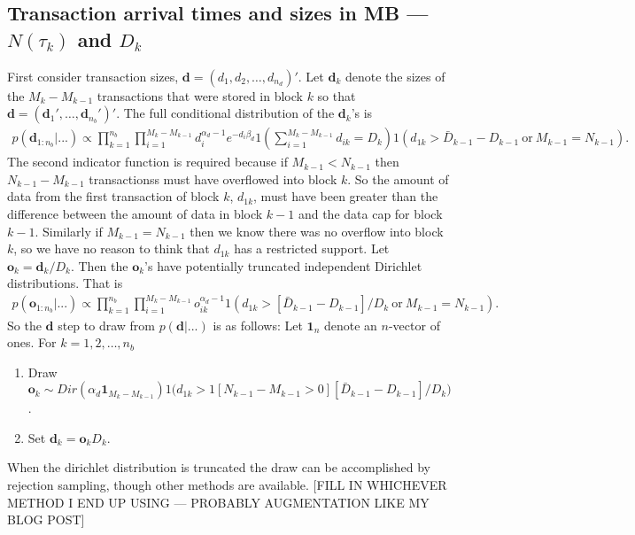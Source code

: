 \documentclass{article}
\begin{document}
\subsection{Transaction arrival times and sizes in MB --- $N(\tau_k)$ and $D_k$}
First consider transaction sizes, $\bm{d}=(d_1,d_2,\dots,d_{n_d})'$. Let $\bm{d}_k$ denote the sizes of the $M_k - M_{k-1}$ transactions that were stored in block $k$ so that $\bm{d} = (\bm{d}_1',\dots,\bm{d}_{n_{b}}')'$. The full conditional distribution of the $\bm{d}_k$'s is
\begin{align*}
p(\bm{d}_{1:n_{b}}|...)\propto \prod_{k=1}^{n_b}\prod_{i=1}^{M_k - M_{k-1}} d_i^{\alpha_d - 1}e^{-d_i\beta_d}1\left(\sum_{i=1}^{M_k - M_{k-1}} d_{ik}= D_k\right)1\left(d_{1k} > \bar{D}_{k-1} - D_{k-1} \mathrm{\ or\ } M_{k-1} = N_{k-1}\right).
\end{align*}
The second indicator function is required because if $M_{k-1} < N_{k-1}$ then $N_{k-1} - M_{k-1}$ transactionss must have overflowed into block $k$. So the amount of data from the first transaction of block $k$, $d_{1k}$, must have been greater than the difference between the amount of data in block $k-1$ and the data cap for block $k-1$. Similarly if $M_{k-1} = N_{k-1}$ then we know there was no overflow into block $k$, so we have no reason to think that $d_{1k}$ has a restricted support. Let $\bm{o}_k = \bm{d}_k/D_k$. Then the $\bm{o}_k$'s have potentially truncated independent Dirichlet distributions. That is
\begin{align*}
p(\bm{o}_{1:n_b}|...)\propto \prod_{k=1}^{n_b} \prod_{i=1}^{M_k - M_{k-1}}o_{ik}^{\alpha_d - 1} 1\left(d_{1k} > [\bar{D}_{k-1} - D_{k-1}]/D_{k} \mathrm{\ or\ } M_{k-1} = N_{k-1}\right).
\end{align*}
So the $\bm{d}$ step to draw from $p(\bm{d}|...)$ is as follows: Let $\bm{1}_n$ denote an $n$-vector of ones. For $k=1,2,\dots,n_b$
\begin{enumerate}
\item Draw $\bm{o}_{k} \sim Dir(\alpha_d\bm{1}_{M_k - M_{k-1}})1\big(d_{1k} > 1[N_{k-1} - M_{k-1} > 0][\bar{D}_{k-1} - D_{k-1}]/D_{k}\big)$.
\item Set $\bm{d}_k = \bm{o}_kD_k$.
\end{enumerate}
When the dirichlet distribution is truncated the draw can be accomplished by rejection sampling, though other methods are available. [FILL IN WHICHEVER METHOD I END UP USING --- PROBABLY AUGMENTATION LIKE MY BLOG POST]
\end{document}
